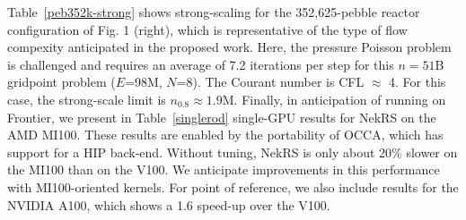 Table~\ref{peb352k-strong} shows strong-scaling for the 352,625-pebble reactor
configuration of Fig. 1 (right), which is representative of the type of flow
compexity anticipated in the proposed work.  Here, the pressure Poisson
problem is challenged and requires an average of 7.2 iterations per step
for this $n=51$B gridpoint problem ($E$=98M, $N$=8).  The Courant number
is CFL $\approx$ 4.  For this case, the strong-scale limit is $n_{0.8}\approx 1.9$M.
Finally, in anticipation of running on Frontier, we present in
Table~\ref{singlerod} single-GPU results for NekRS on the AMD MI100.  These
results are enabled by the portability of OCCA, which has support for a HIP
back-end.  Without tuning, NekRS is only about 20\% slower on the MI100 than on
the V100.   We anticipate improvements in this performance with MI100-oriented
kernels.
For point of reference, we also include results for the NVIDIA
A100, which shows a 1.6 speed-up over the V100.



